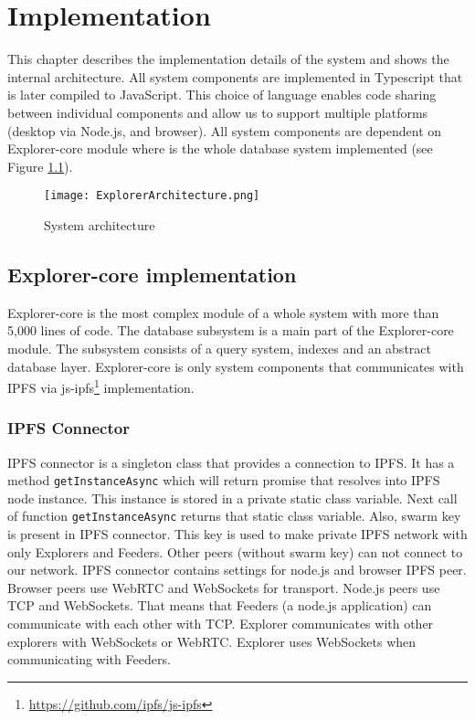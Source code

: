 \chapter{Implementation}
\label{Implementation}
This chapter describes the implementation details of the system and shows the internal architecture. All system components are implemented in Typescript that is later compiled to JavaScript. This choice of language enables code sharing between individual components and allow us to support multiple platforms (desktop via Node.js, and browser). All system components are dependent on Explorer-core module where is the whole database system implemented (see Figure \ref{systemArchitecture}). 


\begin{figure}[h]
    \centering
    \texttt{[image: ExplorerArchitecture.png]}
    \caption{System architecture}
    \label{systemArchitecture}
\end{figure}


\section{Explorer-core implementation}
Explorer-core is the most complex module of a whole system with more than 5,000 lines of code. The database subsystem is a main part of the Explorer-core module. The subsystem consists of a query system, indexes and an abstract database layer. Explorer-core is only system components that communicates with IPFS via js-ipfs\footnote{\url{https://github.com/ipfs/js-ipfs}} implementation.

\subsection{IPFS Connector}
IPFS connector is a singleton class that provides a connection to IPFS. It has a method \texttt{getInstanceAsync} which will return promise that resolves into IPFS node instance. This instance is stored in a private static class variable. Next call of function \texttt{getInstanceAsync} returns that static class variable.
Also, swarm key is present in IPFS connector. This key is used to make private IPFS network with only Explorers and Feeders. Other peers (without swarm key) can not connect to our network. IPFS connector contains settings for node.js and browser IPFS peer. Browser peers use WebRTC and WebSockets for transport. Node.js peers use TCP and WebSockets. That means that Feeders (a node.js application) can communicate with each other with TCP. Explorer communicates with other explorers with WebSockets or WebRTC. Explorer uses WebSockets when communicating with Feeders.

